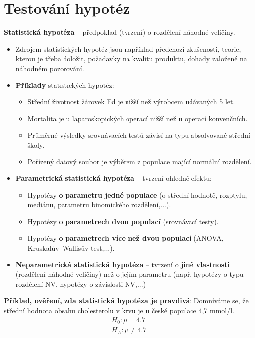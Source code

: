 \section{Testování hypotéz}
\textbf{Statistická hypotéza} -- předpoklad (tvrzení) o rozdělení náhodné veličiny.
\begin{itemize}
    \item Zdrojem statistických hypotéz jsou například předchozí zkušenosti, teorie, kterou je třeba doložit, požadavky na kvalitu produktu, dohady založené na náhodném pozorování.
    \item \textbf{Příklady} statistických hypotéz:
          \begin{itemize}
              \item Střední životnost žárovek Ed je nižší než výrobcem udávaných 5 let.
              \item Mortalita je u laparoskopických operací nižší než u operací konvenčních.
              \item Průměrné výsledky srovnávacích testů závisí na typu absolvované střední školy.
              \item Pořízený datový soubor je výběrem z populace mající normální rozdělení.
          \end{itemize}
    \item \textbf{Parametrická statistická hypotéza} -- tvrzení ohledně efektu:
          \begin{itemize}
              \item Hypotézy \textbf{o parametru jedné populace} (o střední hodnotě, rozptylu, mediánu, parametru binomického rozdělení,...).
              \item Hypotézy \textbf{o parametrech dvou populací} (srovnávací testy).
              \item Hypotézy \textbf{o parametrech více než dvou populací} (ANOVA, Kruskalův--Wallisův test,...).
          \end{itemize}
    \item \textbf{Neparametrická statistická hypotéza} -- tvrzení o \textbf{jiné vlastnosti} (rozdělení náhodné veličiny) než o jejím parametru (např. hypotézy o typu rozdělení NV, hypotézy o závislosti NV,...)
\end{itemize}
\textbf{Příklad, ověření, zda statistická hypotéza je pravdivá}: Domníváme se, že střední hodnota obsahu cholesterolu v krvu je u české populace 4,7 mmol/l.
\begin{equation*}
    \begin{split}
        H_0 : \mu = 4.7   \\
        H_A : \mu \not = 4.7
    \end{split}
\end{equation*}
